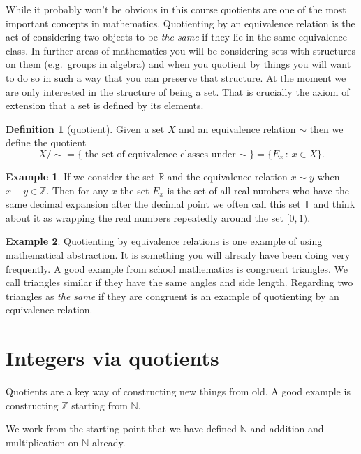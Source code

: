 \documentclass[
]{book}
\theoremstyle{definition}
\newtheorem{definition}{Definition}[chapter]
\theoremstyle{definition}
\newtheorem{example}{Example}[chapter]
\theoremstyle{definition}
\theoremstyle{definition}
\theoremstyle{remark}
\begin{document}
While it probably won't be obvious in this course quotients are one of the most important concepts in mathematics. Quotienting by an equivalence relation is the act of considering two objects to be \emph{the same} if they lie in the same equivalence class. In further areas of mathematics you will be considering sets with structures on them (e.g.~groups in algebra) and when you quotient by things you will want to do so in such a way that you can preserve that structure. At the moment we are only interested in the structure of being a set. That is crucially the axiom of extension that a set is defined by its elements.

\begin{definition}[quotient]
Given a set \(X\) and an equivalence relation \(\sim\) then we define the quotient
\[ X/\sim = \{\mbox{the set of equivalence classes under \(\sim\)}\}= \{ E_x \,:\, x \in X\}.\]
\end{definition}

\begin{example}
If we consider the set \(\mathbb{R}\) and the equivalence relation \(x \sim y\) when \(x-y \in \mathbb{Z}\). Then for any \(x\) the set \(E_x\) is the set of all real numbers who have the same decimal expansion after the decimal point we often call this set \(\mathbb{T}\) and think about it as wrapping the real numbers repeatedly around the set \([0,1)\).
\end{example}

\begin{example}
Quotienting by equivalence relations is one example of using mathematical abstraction. It is something you will already have been doing very frequently. A good example from school mathematics is congruent triangles. We call triangles similar if they have the same angles and side length. Regarding two triangles as \emph{the same} if they are congruent is an example of quotienting by an equivalence relation.
\end{example}

\section{Integers via quotients}\label{integers-via-quotients}

Quotients are a key way of constructing new things from old. A good example is constructing \(\mathbb{Z}\) starting from \(\mathbb{N}\).

We work from the starting point that we have defined \(\mathbb{N}\) and addition and multiplication on \(\mathbb{N}\) already.
\end{document}

